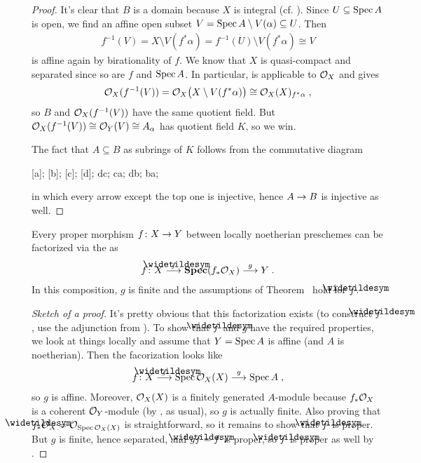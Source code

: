 \documentclass[a4paper,parskip=half,numbers=enddot, DIV=12]{scrreprt}
\begin{document}
\begin{proof}
	It's clear that $B$ is a domain because $X$ is integral (cf. \cite[Proposition~2.1.4]{alggeo1}). Since $U\subseteq \operatorname{Spec} A$ is open, we find an affine open subset $V=\operatorname{Spec} A\setminus V(\alpha)\subseteq U$. Then 
	\begin{align*}
		f^{-1}(V)=X\setminus V(f^*\alpha)=f^{-1}(U)\setminus V(f^*\alpha)\cong V
	\end{align*}
	is affine again by birationality of $f$. We know that $X$ is quasi-compact and separated since so are $f$ and $\operatorname{Spec} A$. In particular, \cite[Proposition~1.5.1]{alggeo1} is applicable to $\mathcal{O}_X$ and gives 
	\begin{align*}
		\mathcal{O}_X(f^{-1}(V))=\mathcal{O}_X\big(X\setminus V(f^*\alpha)\big)\cong\mathcal{O}_X(X)_{f^*\alpha}\;,
	\end{align*}
	so $B$ and $\mathcal{O}_X(f^{-1}(V))$ have the same quotient field. But $\mathcal{O}_X(f^{-1}(V))\cong \mathcal{O}_Y(V)\cong A_\alpha$ has quotient field $K$, so we win.
	
	The fact that $A\subseteq B$ as subrings of $K$ follows from the commutative diagram
	\begin{diagram*}
		[a];
		[b];
		[c];
		[d];
		\scriptsize
		\arrow dc;
		ca;
		db;
		\isoarrow ba;
	\end{diagram*}
	in which every arrow except the top one is injective, hence $A\morphism B$ is injective as well.
\end{proof}
\begin{fact}
	Every proper morphism $f\colon X\morphism Y$ between locally noetherian preschemes can be factorized via the  as
	\begin{align*}
		f\colon X\morphism[\snake{f}]\SPEC(f_*\Oo_X)\morphism[g]Y\;.
	\end{align*}
	In this composition, $g$ is finite and the assumptions of Theorem~ hold for $\snake{f}$.
\end{fact}
\begin{proof}[Sketch of a proof]
	It's pretty obvious that this factorization exists (to construct $\snake{f}$, use the adjunction from \cite[Proposition~1.6.2]{alggeo2}). To show that $\snake{f}$ and $g$ have the required properties, we look at things locally and assume that $Y=\operatorname{Spec} A$ is affine (and $A$ is noetherian). Then the facorization looks like
	\begin{align*}
		f\colon X\morphism[\snake{f}]\Spec \Oo_X(X)\morphism[g]\Spec A\;,
	\end{align*}
	so $g$ is affine. Moreover, $\mathcal{O}_X(X)$ is a finitely generated $A$-module because $f_*\mathcal{O}_X$ is a coherent $\mathcal{O}_Y$-module (by \cite[Theorem~5]{alggeo2}, as usual), so $g$ is actually finite. Also proving that $\snake{f}_*\Oo_X=\Oo_{\Spec \Oo_X(X)}$ is straightforward, so it remains to show that $\snake{f}$ is proper. But $g$ is finite, hence separated, and $g\snake{f}=f$ is proper, so $\snake{f}$ is proper as well by \cite[Proposition~2.4.1]{alggeo2}.
\end{proof}
\end{document}
